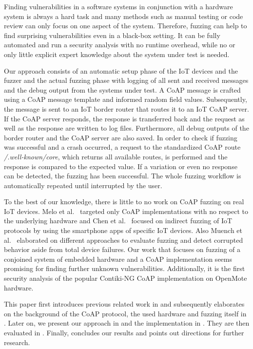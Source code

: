 Finding vulnerabilities in a software systems in conjunction with a hardware system is always a hard task and many methods such as manual testing or code review can only focus on one aspect of the system. Therefore, fuzzing can help to find surprising vulnerabilities even in a black-box setting. It can be fully automated and run a security analysis with no runtime overhead, while no or only little explicit expert knowledge about the system under test is needed.

Our approach consists of an automatic setup phase of the IoT devices and the fuzzer and the actual fuzzing phase with logging of all sent and received messages and the debug output from the systems under test. A CoAP message is crafted using a CoAP message template and informed random field values. Subsequently, the message is sent to an IoT border router that routes it to an IoT CoAP server. If the CoAP server responds, the response is transferred back and the request as well as the response are written to log files. Furthermore, all debug outputs of the border router and the CoAP server are also saved. In order to check if fuzzing was successful and a crash occurred, a request to the standardized CoAP route \textit{/.well-known/core}, which returns all available routes, is performed and the response is compared to the expected value. If a variation or even no response can be detected, the fuzzing has been successful. The whole fuzzing workflow is automatically repeated until interrupted by the user.

To the best of our knowledge, there is little to no work on CoAP fuzzing on real IoT devices. Melo et al.~\cite{Melo2017RobustnessTO} targeted only CoAP implementations with no respect to the underlying hardware and Chen et al.~\cite{chen2018ndss} focused on indirect fuzzing of IoT protocols by using the smartphone apps of specific IoT devices. Also Muench et al.~\cite{EURECOM+5417} elaborated on different approaches to evaluate fuzzing and detect corrupted behavior aside from total device failures. Our work that focuses on fuzzing of a conjoined system of embedded hardware and a CoAP implementation seems promising for finding further unknown vulnerabilities. Additionally, it is the first security analysis of the popular Contiki-NG CoAP implementation on OpenMote hardware.

This paper first introduces previous related work in  and subsequently elaborates on the background of the CoAP protocol, the used hardware and fuzzing itself in . Later on, we present our approach in  and the implementation in . They are then evaluated in . Finally,  concludes our results and points out directions for further research.
